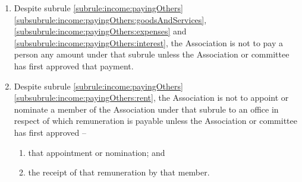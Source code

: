 \begin{enumerate}
	\item Despite subrule \ref{subrule:income:payingOthers}\ref{subsubrule:income:payingOthers:goodsAndServices}, \ref{subsubrule:income:payingOthers:expenses} and \ref{subsubrule:income:payingOthers:interest}, the Association is not to pay a person any amount under that subrule unless the Association or committee has first approved that payment.

	\item Despite subrule \ref{subrule:income:payingOthers}\ref{subsubrule:income:payingOthers:rent}, the Association is not to appoint or nominate a member of the Association under that subrule to an office in respect of which remuneration is payable unless the Association or committee has first approved --
	\begin{enumerate}
		\item that appointment or nomination; and
		\item the receipt of that remuneration by that member.
	\end{enumerate}

\end{enumerate}